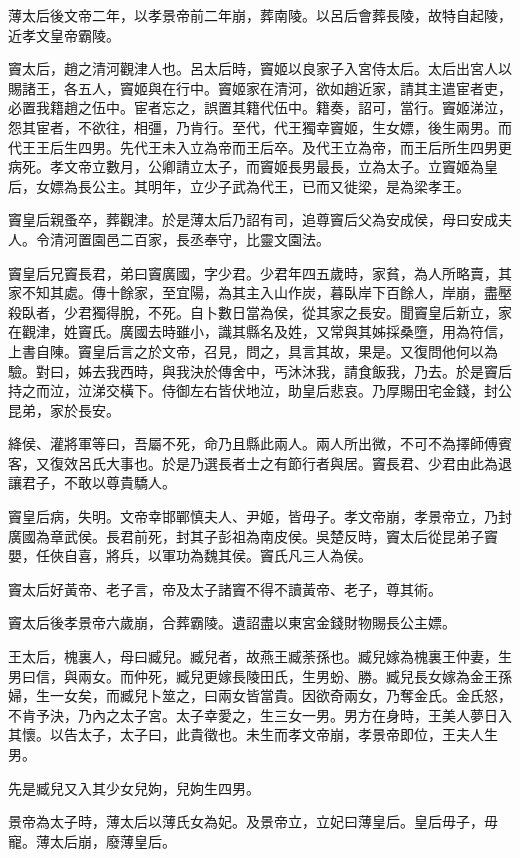薄太后後文帝二年，以孝景帝前二年崩，葬南陵。以呂后會葬長陵，故特自起陵，近孝文皇帝霸陵。

竇太后，趙之清河觀津人也。呂太后時，竇姬以良家子入宮侍太后。太后出宮人以賜諸王，各五人，竇姬與在行中。竇姬家在清河，欲如趙近家，請其主遣宦者吏，必置我籍趙之伍中。宦者忘之，誤置其籍代伍中。籍奏，詔可，當行。竇姬涕泣，怨其宦者，不欲往，相彊，乃肯行。至代，代王獨幸竇姬，生女嫖，後生兩男。而代王王后生四男。先代王未入立為帝而王后卒。及代王立為帝，而王后所生四男更病死。孝文帝立數月，公卿請立太子，而竇姬長男最長，立為太子。立竇姬為皇后，女嫖為長公主。其明年，立少子武為代王，已而又徙梁，是為梁孝王。

竇皇后親蚤卒，葬觀津。於是薄太后乃詔有司，追尊竇后父為安成侯，母曰安成夫人。令清河置園邑二百家，長丞奉守，比靈文園法。

竇皇后兄竇長君，弟曰竇廣國，字少君。少君年四五歲時，家貧，為人所略賣，其家不知其處。傳十餘家，至宜陽，為其主入山作炭，暮臥岸下百餘人，岸崩，盡壓殺臥者，少君獨得脫，不死。自卜數日當為侯，從其家之長安。聞竇皇后新立，家在觀津，姓竇氏。廣國去時雖小，識其縣名及姓，又常與其姊採桑墮，用為符信，上書自陳。竇皇后言之於文帝，召見，問之，具言其故，果是。又復問他何以為驗。對曰，姊去我西時，與我決於傳舍中，丐沐沐我，請食飯我，乃去。於是竇后持之而泣，泣涕交橫下。侍御左右皆伏地泣，助皇后悲哀。乃厚賜田宅金錢，封公昆弟，家於長安。

絳侯、灌將軍等曰，吾屬不死，命乃且縣此兩人。兩人所出微，不可不為擇師傅賓客，又復效呂氏大事也。於是乃選長者士之有節行者與居。竇長君、少君由此為退讓君子，不敢以尊貴驕人。

竇皇后病，失明。文帝幸邯鄲慎夫人、尹姬，皆毋子。孝文帝崩，孝景帝立，乃封廣國為章武侯。長君前死，封其子彭祖為南皮侯。吳楚反時，竇太后從昆弟子竇嬰，任俠自喜，將兵，以軍功為魏其侯。竇氏凡三人為侯。

竇太后好黃帝、老子言，帝及太子諸竇不得不讀黃帝、老子，尊其術。

竇太后後孝景帝六歲崩，合葬霸陵。遺詔盡以東宮金錢財物賜長公主嫖。

王太后，槐裏人，母曰臧兒。臧兒者，故燕王臧荼孫也。臧兒嫁為槐裏王仲妻，生男曰信，與兩女。而仲死，臧兒更嫁長陵田氏，生男蚡、勝。臧兒長女嫁為金王孫婦，生一女矣，而臧兒卜筮之，曰兩女皆當貴。因欲奇兩女，乃奪金氏。金氏怒，不肯予決，乃內之太子宮。太子幸愛之，生三女一男。男方在身時，王美人夢日入其懷。以告太子，太子曰，此貴徵也。未生而孝文帝崩，孝景帝即位，王夫人生男。

先是臧兒又入其少女兒姁，兒姁生四男。

景帝為太子時，薄太后以薄氏女為妃。及景帝立，立妃曰薄皇后。皇后毋子，毋寵。薄太后崩，廢薄皇后。

